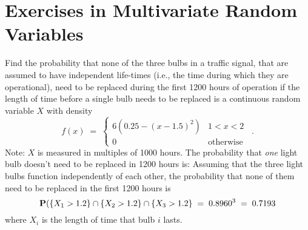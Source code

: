 \section{Exercises in Multivariate Random Variables}\label{S:xsMultivariateRVs}
\begin{ExerciseList}
\Exercise
Find the probability that none of the three bulbs in a traffic signal, that are assumed to have independent life-times (i.e., the time during which they are operational), need to be replaced during the first 1200 hours of operation if the length of time before a single bulb needs to  be replaced is a continuous random variable $X$ with density
$$f(x)\;=\;\begin{cases}6\left(0.25-(x-1.5)^2\right)&1<x<2\\0&\textrm{otherwise}\end{cases}\enspace.$$
Note: $X$ is measured in multiples of 1000 hours.
\Answer
The probability that  \emph{one}  light bulb doesn't need to be replaced in  1200 hours is:
Assuming  that   the three light bulbs function  independently of  each
other, the probability that none of them need to be replaced in the
first 1200 hours is
$$\mathbf{P}(\{X_1>1.2\}\cap\{X_2>1.2\}\cap\{X_3>1.2\}\;=\;0.8960^3\;=\;
0.7193$$
where $X_i$ is the length of time that bulb $i$ lasts.


\end{ExerciseList}
